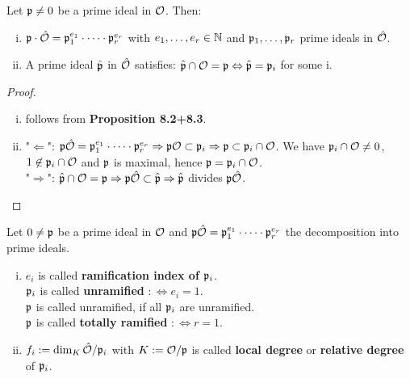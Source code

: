 \begin{Bem}
	Let $\mathfrak{p} \neq 0$ be a prime ideal in $\mathcal{O}$. Then:
	\begin{enumerate}[(i)]
		\item $\mathfrak{p} \cdot \hat{\mathcal{O}} = \mathfrak{p}_1^{e_1} \cdot \dots \cdot \mathfrak{p}_r^{e_r}$ with $e_1,\dots,e_r \in \mathbb{N}$ and $\mathfrak{p}_1, \dots, \mathfrak{p}_r$ prime ideals in $\hat{\mathcal{O}}$.
		
		\item A prime ideal $\hat{\mathfrak{p}}$ in $\hat{\mathcal{O}}$ satisfies: $\hat{\mathfrak{p}} \cap \mathcal{O} = \mathfrak{p} \Leftrightarrow \hat{\mathfrak{p}} = \mathfrak{p}_i$ for some i.
	\end{enumerate}
\end{Bem}
\begin{proof}
	\begin{enumerate}[(i)]
		\item follows from  \textbf{Proposition 8.2+8.3}.
		
		\item "$\Leftarrow$": $\mathfrak{p}\hat{\mathcal{O}} = \mathfrak{p}_1^{e_1} \cdot \dots \cdot \mathfrak{p}_r^{e_r} \Rightarrow \mathfrak{p}\mathcal{O} \subset \mathfrak{p}_i \Rightarrow \mathfrak{p} \subset \mathfrak{p}_i \cap \mathcal{O}$. We have $\mathfrak{p}_i \cap \mathcal{O} \neq 0$, $1 \not\in \mathfrak{p}_i \cap \mathcal{O}$ and $\mathfrak{p}$ is maximal, hence $\mathfrak{p} = \mathfrak{p}_i \cap \mathcal{O}$.\\
		"$\Rightarrow$": $\hat{\mathfrak{p}} \cap \mathcal{O} = \mathfrak{p} \Rightarrow \mathfrak{p}\hat{\mathcal{O}} \subset \hat{\mathfrak{p}} \Rightarrow \hat{\mathfrak{p}}$ divides $\mathfrak{p}\hat{\mathcal{O}}$.
	\end{enumerate}
\end{proof}

\begin{defi}
	Let $0 \neq \mathfrak{p}$ be a prime ideal in $\mathcal{O}$ and $\mathfrak{p}\hat{\mathcal{O}} = \mathfrak{p}_1^{e_1} \cdot \dots \cdot \mathfrak{p}_r^{e_r}$ the decomposition into prime ideals.
	\begin{enumerate}[(i)]
		\item $e_i$ is called \textbf{ramification index of $\mathfrak{p}_i$}.\\
		$\mathfrak{p}_i$ is called \textbf{unramified} $:\Leftrightarrow e_i = 1$.\\
		$\mathfrak{p}$ is called unramified, if all $\mathfrak{p}_i$ are unramified.\\
		$\mathfrak{p}$ is called \textbf{totally ramified} $:\Leftrightarrow r = 1$. 
		
		\item $f_i : = \dim_K \hat{\mathcal{O}} / \mathfrak{p}_i$ with $K:=\mathcal{O}/\mathfrak{p}$ is called \textbf{local degree} or \textbf{relative degree} of $\mathfrak{p}_i$.
	\end{enumerate}
\end{defi}

